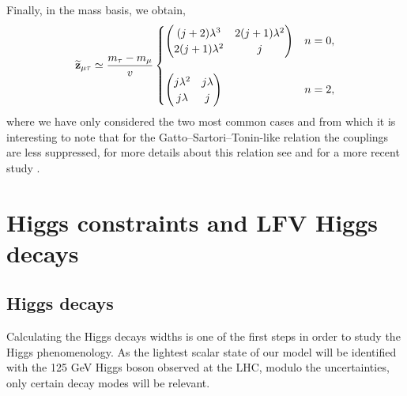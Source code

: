 \documentclass[aps,prd,groupaddress,floatfix,tighten,nofootinbib,showpacs,
amsfonts,superscriptaddress]{revtex4}
\begin{document}
Finally, in the mass basis, we obtain,
\begin{eqnarray}
	\widetilde{\bf z}_{\mu \tau} \simeq \frac{m_\tau - m_\mu}{v} 
	\begin{cases}
		\begin{pmatrix}
			(j+2)\lambda^3 & 2(j+1)\lambda^2 \\
			2(j+1)\lambda^2 & j
		\end{pmatrix}  & n= 0, \\
		{} \\
		\begin{pmatrix}
			j\lambda^2 & j\lambda \\
			j\lambda & j
		\end{pmatrix} & n= 2,
	\end{cases}
	\label{eq:casesvertex}
\end{eqnarray}
where we have only considered the two most common cases and from which it is interesting to note 
that for the Gatto--Sartori--Tonin-like relation the couplings are less suppressed, for more details about this relation see \cite{Gatto:1968ss} and for a more recent study \cite{Saldana-Salazar:2016hxb}.


\section{Higgs constraints and LFV Higgs decays\label{Sec:Higgs-constraints}}

\subsection{Higgs decays\label{Sec:HiggsDecays}}
Calculating the Higgs decays widths is one of the first steps in order to study the Higgs phenomenology. As the lightest scalar state of our model will be identified with the 125 GeV Higgs boson observed at the LHC, modulo the uncertainties, only certain decay modes will be relevant. 
\end{document}
